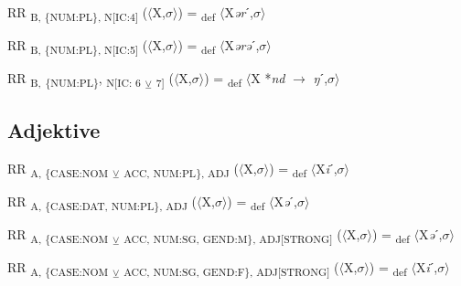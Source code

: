 {\begin{exe}
 RR \textsubscript{B, \{NUM:PL\}, N[IC:4]} ($\langle$X,$\sigma $$\rangle$) = \textsubscript{def} $\langle$X\textit{ər}ˊ,$\sigma $$\rangle$
\end{exe}

\begin{exe}
 RR \textsubscript{B, \{NUM:PL\}, N[IC:5]} ($\langle$X,$\sigma $$\rangle$) = \textsubscript{def} $\langle$X\textit{ərə}ˊ,$\sigma $$\rangle$
\end{exe}

\begin{exe}
 RR \textsubscript{B,} \textsubscript{\{NUM:PL\}}, \textsubscript{N[IC: 6} \textsubscript{${\veebar}$}\textsubscript{ 7]} ($\langle$X,$\sigma $$\rangle$) = \textsubscript{def} $\langle$X *\textit{nd} $\rightarrow$ \textit{ŋ}ˊ,$\sigma $$\rangle$
\end{exe}

\subsection{Adjektive}

\begin{exe}
 RR \textsubscript{A, \{CASE:NOM} \textsubscript{${\veebar}$}\textsubscript{ ACC, NUM:PL\}, ADJ} ($\langle$X,$\sigma $$\rangle$) = \textsubscript{def} $\langle$X\textit{i}ˊ,$\sigma $$\rangle$
\end{exe}

\begin{exe}
 RR \textsubscript{A, \{CASE:DAT, NUM:PL\}, ADJ} ($\langle$X,$\sigma $$\rangle$) = \textsubscript{def} $\langle$X\textit{ə}ˊ,$\sigma $$\rangle$
\end{exe}

\begin{exe}
 RR \textsubscript{A, \{CASE:NOM} \textsubscript{${\veebar}$}\textsubscript{ ACC, NUM:SG, GEND:M\}, ADJ[STRONG]} ($\langle$X,$\sigma $$\rangle$) = \textsubscript{def} $\langle$X\textit{ə}ˊ,$\sigma $$\rangle$
\end{exe}

\begin{exe}
 RR \textsubscript{A, \{CASE:NOM} \textsubscript{${\veebar}$}\textsubscript{ ACC, NUM:SG, GEND:F\}, ADJ[STRONG]} ($\langle$X,$\sigma $$\rangle$) = \textsubscript{def} $\langle$X\textit{i}ˊ,$\sigma $$\rangle$
\end{exe}

}
